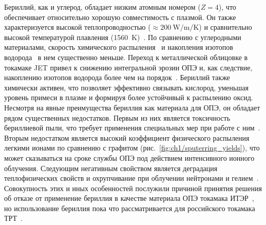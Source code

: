 Бериллий, как и углерод, обладает низким атомным номером ($Z=4$), что обеспечивает относительно хорошую совместимость с плазмой. Он также характеризуется высокой теплопроводностью (\( \approx \SI{200}{\watt\per\meter\per\K} \)) и сравнительно высокой температурой плавления (\SI{1560}{\kelvin})~\cite{Ho1974}. По сравнению с углеродными материалами, скорость химического распыления~\cite{Brezinsek2014} и накопления изотопов водорода~\cite{DeTemmerman2021} в нем существенно меньше. Переход к металлической облицовке в токамаке JET привел к снижению интегральной эрозии ОПЭ и, как следствие, накоплению изотопов водорода более чем на порядок~\cite{Brezinsek2015}. Бериллий также химически активен, что позволяет эффективно связывать кислород, уменьшая уровень примеси в плазме и формируя более устойчивый к распылению оксид. Несмотря на явные преимущества бериллия как материала для ОПЭ, он обладает рядом существенных недостатков. Первым из них является токсичность бериллиевой пыли, что требует применения специальных мер при работе с ним~\cite{Strupp2011}. Вторым недостатком является высокий коэффициент физического распыления легкими ионами по сравнению с графитом (рис.~\cref{fig:ch1/sputerring_yields}), что может сказываться на сроке службы ОПЭ под действием интенсивного ионного облучения. Следующим негативным свойством является деградация теплофизических свойств и охрупчивание при облучении нейтронами и гелием~\cite{Kesternich2003,Gilbert2012}. Совокупность этих и иных особенностей послужили причиной принятия решения об отказе от применение бериллия в качестве материала ОПЭ токамака ИТЭР~\cite{Barabaschi2025}, но использование бериллия пока что рассматривается для российского токамака ТРТ~\cite{Mazul2021,Piskarev2024}.

